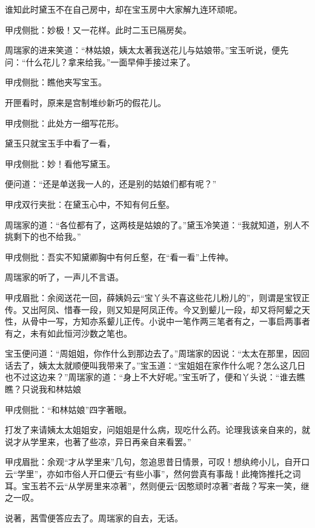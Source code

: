 \begin{parag}


    谁知此时黛玉不在自己房中，却在宝玉房中大家解九连环顽呢。\begin{note}甲戌侧批：妙极！又一花样。此时二玉已隔房矣。\end{note}周瑞家的进来笑道：“林姑娘，姨太太著我送花儿与姑娘带。”宝玉听说，便先问：“什么花儿？拿来给我。”一面早伸手接过来了。\begin{note}甲戌侧批：瞧他夹写宝玉。\end{note}开匣看时，原来是宫制堆纱新巧的假花儿。\begin{note}甲戌侧批：此处方一细写花形。\end{note}黛玉只就宝玉手中看了一看，\begin{note}甲戌侧批：妙！看他写黛玉。\end{note}便问道：“还是单送我一人的，还是别的姑娘们都有呢？”\begin{note}甲戌双行夹批：在黛玉心中，不知有何丘壑。\end{note}周瑞家的道：“各位都有了，这两枝是姑娘的了。”黛玉冷笑道：“我就知道，别人不挑剩下的也不给我。”\begin{note}甲戌侧批：吾实不知黛卿胸中有何丘壑，在“看一看”上传神。\end{note}周瑞家的听了，一声儿不言语。\begin{note}甲戌眉批：余阅送花一回，薛姨妈云“宝丫头不喜这些花儿粉儿的”，则谓是宝钗正传。又出阿凤、惜春一段，则又知是阿凤正传。今又到颦儿一段，却又将阿颦之天性，从骨中一写，方知亦系颦儿正传。小说中一笔作两三笔者有之，一事启两事者有之，未有如此恒河沙数之笔也。\end{note}宝玉便问道：“周姐姐，你作什么到那边去了。”周瑞家的因说：“太太在那里，因回话去了，姨太太就顺便叫我带来了。”宝玉道：“宝姐姐在家作什么呢？怎么这几日也不过这边来？”周瑞家的道：“身上不大好呢。”宝玉听了，便和丫头说：“谁去瞧瞧？只说我和林姑娘\begin{note}甲戌侧批：“和林姑娘”四字著眼。\end{note}打发了来请姨太太姐姐安，问姐姐是什么病，现吃什么药。论理我该亲自来的，就说才从学里来，也著了些凉，异日再亲自来看罢。”\begin{note}甲戌眉批：余观“才从学里来”几句，忽追思昔日情景，可叹！想纨绔小儿，自开口云“学里”，亦如市俗人开口便云“有些小事”，然何尝真有事哉！此掩饰推托之词耳。宝玉若不云“从学房里来凉著”，然则便云“因憨顽时凉著”者哉？写来一笑，继之一叹。\end{note}说著，茜雪便答应去了。周瑞家的自去，无话。
\end{parag}


